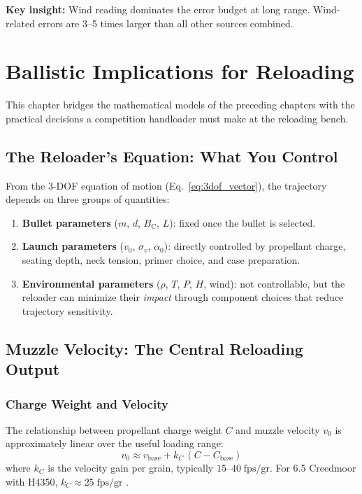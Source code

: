 \documentclass[11pt,twoside,openright]{report}
\newcommand{\Bc}{B_{\mathrm{C}}}
\begin{document}
\textbf{Key insight:} Wind reading dominates the error budget at long range. Wind-related errors are 3--5 times larger than all other sources combined.


\chapter{Ballistic Implications for Reloading}
\label{ch:reload_implications}

This chapter bridges the mathematical models of the preceding chapters with the practical decisions a competition handloader must make at the reloading bench.

\section{The Reloader's Equation: What You Control}

From the 3-DOF equation of motion (Eq.~\ref{eq:3dof_vector}), the trajectory depends on three groups of quantities:

\begin{enumerate}[label=\textbf{\arabic*.}]
  \item \textbf{Bullet parameters} ($m$, $d$, $\Bc$, $L$): fixed once the bullet is selected.
  \item \textbf{Launch parameters} ($v_0$, $\sigma_v$, $\alpha_0$): directly controlled by propellant charge, seating depth, neck tension, primer choice, and case preparation.
  \item \textbf{Environmental parameters} ($\rho$, $T$, $P$, $H$, wind): not controllable, but the reloader can minimize their \emph{impact} through component choices that reduce trajectory sensitivity.
\end{enumerate}

\section{Muzzle Velocity: The Central Reloading Output}

\subsection{Charge Weight and Velocity}

The relationship between propellant charge weight $C$ and muzzle velocity $v_0$ is approximately linear over the useful loading range:
\begin{equation}
  v_0 \approx v_{\mathrm{base}} + k_C\,(C - C_{\mathrm{base}})
  \label{eq:charge_vel_linear}
\end{equation}
where $k_C$ is the velocity gain per grain, typically $15$--$40\;\text{fps/gr}$. For 6.5 Creedmoor with H4350, $k_C \approx 25\;\text{fps/gr}$ \citep{litz2011applied}.
\end{document}
